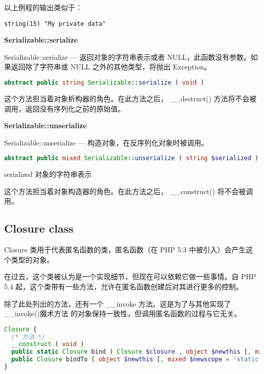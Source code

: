 以上例程的输出类似于：

\begin{verbatim}
string(15) "My private data"
\end{verbatim}


\textbf{Serializable::serialize}

Serializable::serialize — 返回对象的字符串表示或者 NULL，此函数没有参数。如果返回除了字符串或 NULL 之外的其他类型，将抛出 Exception。


\begin{lstlisting}[language=PHP]
abstract public string Serializable::serialize ( void )
\end{lstlisting}

这个方法担当着对象析构器的角色。在此方法之后， \_\_destruct() 方法将不会被调用，返回没有序列化之前的原始值。


\textbf{Serializable::unserialize}

Serializable::unserialize — 构造对象，在反序列化对象时被调用。

\begin{lstlisting}[language=PHP]
abstract public mixed Serializable::unserialize ( string $serialized )
\end{lstlisting}

\begin{compactitem}
\item serialized
对象的字符串表示
\end{compactitem}

这个方法担当着对象构造器的角色。在此方法之后， \_\_construct() 将不会被调用。


\subsection{Closure class}


Closure 类用于代表匿名函数的类，匿名函数（在 PHP 5.3 中被引入）会产生这个类型的对象。

在过去，这个类被认为是一个实现细节，但现在可以依赖它做一些事情。自 PHP 5.4 起，这个类带有一些方法，允许在匿名函数创建后对其进行更多的控制。

除了此处列出的方法，还有一个 \_\_invoke 方法。这是为了与其他实现了 \_\_invoke()魔术方法 的对象保持一致性，但调用匿名函数的过程与它无关。

\begin{lstlisting}[language=PHP]
Closure {
  /* 方法 */
  __construct ( void )
  public static Closure bind ( Closure $closure , object $newthis [, mixed $newscope = 'static' ] )
  public Closure bindTo ( object $newthis [, mixed $newscope = 'static' ] )
}
\end{lstlisting}

